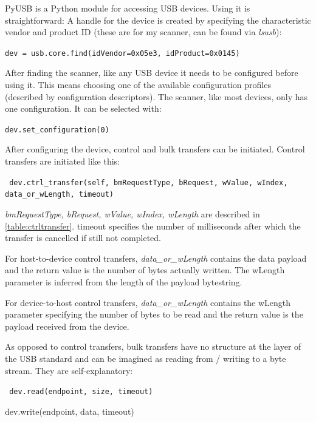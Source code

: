 \documentclass{article}
\begin{document}
PyUSB \cite{pyusb} is a Python module for accessing USB devices.
Using it is straightforward:
A handle for the device is created by specifying the characteristic
vendor and product ID (these are for my scanner, can be found via {\it lsusb}):

\begin{center}
\tt dev = usb.core.find(idVendor=0x05e3, idProduct=0x0145)
\end{center}

After finding the scanner, like any USB device it needs to be configured
before using it. This means choosing one of the available configuration
profiles (described by configuration descriptors). The scanner, like most
devices, only has one configuration. It can be selected with:

\begin{center}
\tt dev.set\_configuration(0)
\end{center}

After configuring the device, control and bulk transfers can be initiated.
Control transfers are initiated like this:

\begin{center}
\tt
dev.ctrl\_transfer(self, bmRequestType, bRequest, wValue, wIndex, data\_or\_wLength, timeout)
\end{center}

{\it bmRequestType, bRequest, wValue, wIndex, wLength} are described in \autoref{table:ctrltransfer}.
timeout specifies the number of milliseconds after which the transfer is cancelled if
still not completed.

For host-to-device control transfers, {\it data\_or\_wLength} contains the data payload
and the return value is the number of bytes actually written. The wLength parameter
is inferred from the length of the payload bytestring.

For device-to-host control transfers, {\it data\_or\_wLength} contains the wLength
parameter specifying the number of bytes to be read and the return value is the payload
received from the device.

As opposed to control transfers, bulk transfers have no structure at the layer
of the USB standard and can be imagined as reading from / writing to a byte stream.
They are self-explanatory:

\begin{center}
\tt
dev.read(endpoint, size, timeout)

dev.write(endpoint, data, timeout)
\end{center}
\end{document}
